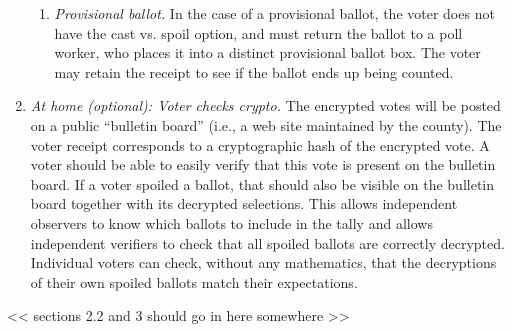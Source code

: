 \begin{enumerate}
\begin{enumerate}
\item {\em Provisional ballot.}
In the case of a provisional ballot, the voter does not have the cast vs. spoil option, and must return the ballot to a poll worker, who places it into a distinct provisional ballot box. The voter may retain the receipt to see if the ballot ends up being counted.
\end{enumerate}

\item {\em At home (optional): Voter checks crypto.}
The encrypted votes will be posted on a public ``bulletin board''
 (i.e., a web site maintained by the county).
 The voter receipt corresponds to a cryptographic hash of the encrypted vote.
 A voter should be able to easily verify that this vote is present on the bulletin board.
 If a voter spoiled a ballot, that should also be visible on the bulletin board
 together with its decrypted selections.  This allows independent observers to
 know which ballots to include in the tally and allows independent verifiers
 to check that all spoiled ballots are correctly decrypted.  Individual voters can
 check, without any mathematics,
 that the decryptions of their own spoiled ballots match their expectations.
\end{enumerate}

<< sections 2.2 and 3 should go in here somewhere >>


